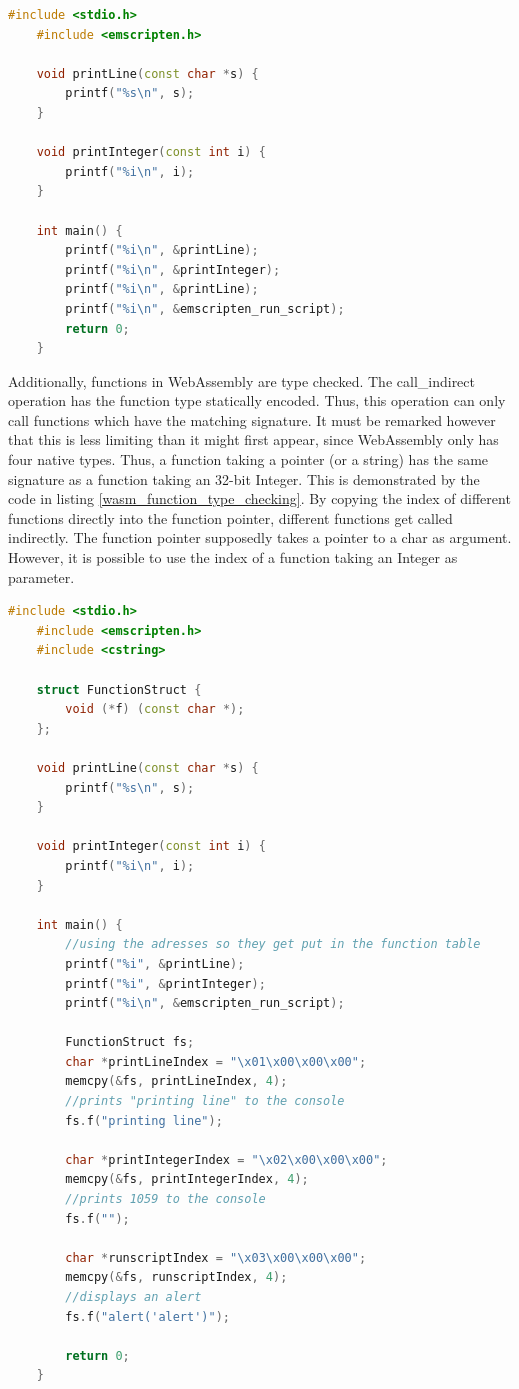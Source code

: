 \documentclass[sigconf]{acmart}
\begin{document}
\begin{lstlisting}[language=C++, caption={This Code demonstrates how WebAssembly handles function pointers. This code prints 1,2,1,3 to the console when running it in the browser.}, label={fig:wasm_function_addr}]
	#include <stdio.h>
	#include <emscripten.h>

	void printLine(const char *s) {
		printf("%s\n", s);
	}

	void printInteger(const int i) {
		printf("%i\n", i);
	}

	int main() {
		printf("%i\n", &printLine);
		printf("%i\n", &printInteger);
		printf("%i\n", &printLine);
		printf("%i\n", &emscripten_run_script);
		return 0;
	}
\end{lstlisting}

Additionally, functions in WebAssembly are type checked. The call\_indirect operation has the function type statically encoded. Thus, this operation can only call functions which have the matching signature. It must be remarked however that this is less limiting than it might first appear, since WebAssembly only has four native types. Thus, a function taking a pointer (or a string) has the same signature as a function taking an 32-bit Integer. This is demonstrated by the code in listing \ref{wasm_function_type_checking}. By copying the index of different functions directly into the function pointer, different functions get called indirectly. The function pointer supposedly takes a pointer to a char as argument. However, it is possible to use the index of a function taking an Integer as parameter. 

\begin{lstlisting}[language=C++, caption={Example demonstrating how function pointer type checking works.}, label={fig:wasm_function_type_checking}]
	#include <stdio.h>
	#include <emscripten.h>
	#include <cstring>

	struct FunctionStruct {
		void (*f) (const char *);
	};

	void printLine(const char *s) {
		printf("%s\n", s);
	}

	void printInteger(const int i) {
		printf("%i\n", i);
	}

	int main() {	
		//using the adresses so they get put in the function table
		printf("%i", &printLine);
		printf("%i", &printInteger);
		printf("%i\n", &emscripten_run_script);
		
		FunctionStruct fs;
		char *printLineIndex = "\x01\x00\x00\x00";
		memcpy(&fs, printLineIndex, 4);
		//prints "printing line" to the console
		fs.f("printing line"); 
		
		char *printIntegerIndex = "\x02\x00\x00\x00";
		memcpy(&fs, printIntegerIndex, 4);
		//prints 1059 to the console
		fs.f("");
		
		char *runscriptIndex = "\x03\x00\x00\x00";
		memcpy(&fs, runscriptIndex, 4);
		//displays an alert
		fs.f("alert('alert')");		
		
		return 0;
	}
\end{lstlisting}
\end{document}
